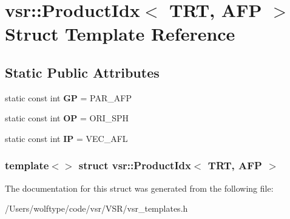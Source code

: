 \hypertarget{structvsr_1_1_product_idx_3_01_t_r_t_00_01_a_f_p_01_4}{\section{vsr\-:\-:Product\-Idx$<$ T\-R\-T, A\-F\-P $>$ Struct Template Reference}
\label{structvsr_1_1_product_idx_3_01_t_r_t_00_01_a_f_p_01_4}
}
\subsection*{Static Public Attributes}
\begin{DoxyCompactItemize}
\item 
\hypertarget{structvsr_1_1_product_idx_3_01_t_r_t_00_01_a_f_p_01_4_aa648260ca2eb0d6bd3dd881c5fabb99d}{static const int {\bfseries G\-P} = P\-A\-R\-\_\-\-A\-F\-P}\label{structvsr_1_1_product_idx_3_01_t_r_t_00_01_a_f_p_01_4_aa648260ca2eb0d6bd3dd881c5fabb99d}

\item 
\hypertarget{structvsr_1_1_product_idx_3_01_t_r_t_00_01_a_f_p_01_4_a48f04bb6e01db9f22dbbe727be29423e}{static const int {\bfseries O\-P} = O\-R\-I\-\_\-\-S\-P\-H}\label{structvsr_1_1_product_idx_3_01_t_r_t_00_01_a_f_p_01_4_a48f04bb6e01db9f22dbbe727be29423e}

\item 
\hypertarget{structvsr_1_1_product_idx_3_01_t_r_t_00_01_a_f_p_01_4_a7016484a4a096be496fb2e7357927ed1}{static const int {\bfseries I\-P} = V\-E\-C\-\_\-\-A\-F\-L}\label{structvsr_1_1_product_idx_3_01_t_r_t_00_01_a_f_p_01_4_a7016484a4a096be496fb2e7357927ed1}

\end{DoxyCompactItemize}
\subsubsection*{template$<$$>$ struct vsr\-::\-Product\-Idx$<$ T\-R\-T, A\-F\-P $>$}



The documentation for this struct was generated from the following file\-:\begin{DoxyCompactItemize}
\item 
/\-Users/wolftype/code/vsr/\-V\-S\-R/vsr\-\_\-templates.\-h\end{DoxyCompactItemize}
